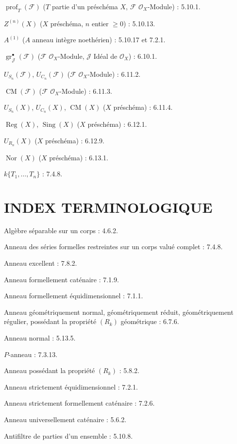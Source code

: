 $\operatorname{prof}_T(\mathscr F)$ ($T$ partie d'un préschéma $X$, $\mathscr F$
$\mathcal O_X$-Module) : 5.10.1.

$Z^{(n)}(X)$ ($X$ préschéma, $n$ entier $\geq0$) : 5.10.13.

$A^{(1)}$ ($A$ anneau intègre noethérien) : 5.10.17 et 7.2.1.

$\operatorname{gr}_{\mathscr J}^{\bullet}(\mathscr F)$ ($\mathscr F$
$\mathcal O_X$-Module, $\mathscr J$ Idéal de $\mathcal O_X$) : 6.10.1.

$U_{S_n}(\mathscr F)$, $U_{C_n}(\mathscr F)$ ($\mathscr F$
$\mathcal O_X$-Module) : 6.11.2.

$\operatorname{CM}(\mathscr F)$ ($\mathscr F$ $\mathcal O_X$-Module) : 6.11.3.

$U_{S_n}(X)$, $U_{C_n}(X)$, $\operatorname{CM}(X)$ ($X$ préschéma) : 6.11.4.

$\operatorname{Reg}(X)$, $\operatorname{Sing}(X)$ ($X$ préschéma) : 6.12.1.

$U_{R_n}(X)$ ($X$ préschéma) : 6.12.9.

$\operatorname{Nor}(X)$ ($X$ préschéma) : 6.13.1.

$k\{T_1,\ldots,T_n\}$ : 7.4.8.

\endgroup

\clearpage
{}
{}
\section*{INDEX TERMINOLOGIQUE}

\begingroup
\footnotesize
\setlength{\parindent}{0pt}
\setlength{\parskip}{1.1pt}
\newcommand{\EGAIVtwoTerm}[2]{#1 : #2.\par}

\EGAIVtwoTerm{Algèbre séparable sur un corps}{4.6.2}
\EGAIVtwoTerm{Anneau des séries formelles restreintes sur un corps valué complet}{7.4.8}
\EGAIVtwoTerm{Anneau excellent}{7.8.2}
\EGAIVtwoTerm{Anneau formellement caténaire}{7.1.9}
\EGAIVtwoTerm{Anneau formellement équidimensionnel}{7.1.1}
\EGAIVtwoTerm{Anneau géométriquement normal, géométriquement réduit,
géométriquement régulier, possédant la propriété $(R_k)$ géométrique}{6.7.6}
\EGAIVtwoTerm{Anneau normal}{5.13.5}
\EGAIVtwoTerm{$P$-anneau}{7.3.13}
\EGAIVtwoTerm{Anneau possédant la propriété $(R_k)$}{5.8.2}
\EGAIVtwoTerm{Anneau strictement équidimensionnel}{7.2.1}
\EGAIVtwoTerm{Anneau strictement formellement caténaire}{7.2.6}
\EGAIVtwoTerm{Anneau universellement caténaire}{5.6.2}
\EGAIVtwoTerm{Antifiltre de parties d'un ensemble}{5.10.8}

